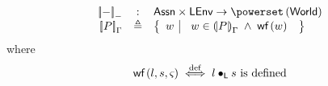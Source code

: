 \begin{definition}
\[%
%
%	
\]
%
%
%
%
%
\end{definition}
%
%
\begin{definition}
%
\[
\begin{array}{r c l}
\sem[-]{-} & : & \Assertions \times \LEnv \rightarrow \pset{\Worlds} \\

\sem{P} & \eqdef & 
\left\{
\begin{array}{l | l}
 w &
 \begin{array}{l}
 	 w \in \intermediateSem{P} \;\land\;
 	 \wf{w}
 	\end{array} 
\end{array}
\right\}\\
\end{array}
\]
%
where 
%
\[
	\textsf{wf}\left( l, s, \varsigma_{} \right) \stackrel{\mathrm{def}}{\iff} l \bullet_{\textsf{L}} s  \text{ is defined}
\]
%
\end{definition}
